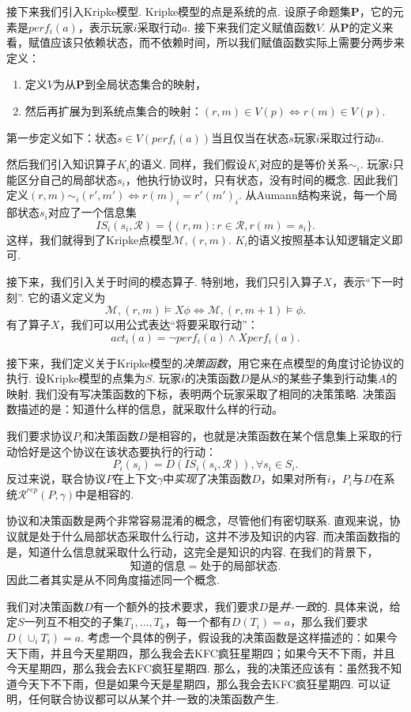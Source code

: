 接下来我们引入Kripke模型. Kripke模型的点是系统的点. 设原子命题集$\mathbf P$，它的元素是$perf_i(a)$，表示玩家$i$采取行动$a$. 接下来我们定义赋值函数$V$. 从$\mathbf P$的定义来看，赋值应该只依赖状态，而不依赖时间，所以我们赋值函数实际上需要分两步来定义：
\begin{enumerate}
    \item 定义$V$为从$\mathbf P$到全局状态集合的映射，
    \item 然后再扩展为到系统点集合的映射：$(r,m)\in V(p)\iff r(m)\in V(p)$.
\end{enumerate}
第一步定义如下：状态$s\in V(perf_i(a))$当且仅当在状态$s$玩家$i$采取过行动$a$.

然后我们引入知识算子$K_i$的语义. 同样，我们假设$K_i$对应的是等价关系$\sim_i$. 玩家$i$只能区分自己的局部状态$s_i$，他执行协议时，只有状态，没有时间的概念. 因此我们定义$(r,m)\sim_i (r',m')\iff r(m)_i=r'(m')_i$. 从Aumann结构来说，每一个局部状态$s_i$对应了一个信息集
    \[IS_i(s_i,\mathcal R)=\{(r,m):r\in\mathcal R,r(m)=s_i\}.\]
这样，我们就得到了Kripke点模型$\mathcal M,(r,m)$. $K_i$的语义按照基本认知逻辑定义即可.

接下来，我们引入关于时间的模态算子. 特别地，我们只引入算子$X$，表示“下一时刻”. 它的语义定义为
    \[\mathcal M,(r,m)\vDash X\phi\iff\mathcal M,(r,m+1)\vDash\phi.\]
有了算子$X$，我们可以用公式表达“将要采取行动”：
    \[act_i(a)=\neg perf_i(a)\wedge X perf_i(a).\]

接下来，我们定义关于Kripke模型的\emph{决策函数}，用它来在点模型的角度讨论协议的执行. 设Kripke模型的点集为$S$. 玩家$i$的决策函数$D$是从$S$的某些子集到行动集$A$的映射. 我们没有写决策函数的下标，表明两个玩家采取了相同的决策策略. 决策函数描述的是：知道什么样的信息，就采取什么样的行动。

我们要求协议$P_i$和决策函数$D$是相容的，也就是决策函数在某个信息集上采取的行动恰好是这个协议在该状态要执行的行动：
    \[P_i(s_i)=D(IS_i(s_i,\mathcal R)),\forall s_i\in S_i.\]
反过来说，联合协议$P$在上下文$\gamma$中\emph{实现}了决策函数$D$，如果对所有$i$，$P_i$与$D$在系统$\mathcal R^{rep}(P,\gamma)$中是相容的.

协议和决策函数是两个非常容易混淆的概念，尽管他们有密切联系. 直观来说，协议就是处于什么局部状态采取什么行动，这并不涉及知识的内容. 而决策函数指的是，知道什么信息就采取什么行动，这完全是知识的内容. 在我们的背景下，
    \[\text{知道的信息}=\text{处于的局部状态}.\]
因此二者其实是从不同角度描述同一个概念.

我们对决策函数$D$有一个额外的技术要求，我们要求$D$是\emph{并-一致}的. 具体来说，给定$S$一列互不相交的子集$T_1,\dots,T_k$，每一个都有$D(T_i)=a$，那么我们要求$D(\cup_i T_i)=a$. 考虑一个具体的例子，假设我的决策函数是这样描述的：如果今天下雨，并且今天星期四，那么我会去KFC疯狂星期四；如果今天不下雨，并且今天星期四，那么我会去KFC疯狂星期四. 那么，我的决策还应该有：虽然我不知道今天下不下雨，但是如果今天是星期四，那么我会去KFC疯狂星期四. 可以证明，任何联合协议都可以从某个并-一致的决策函数产生.


